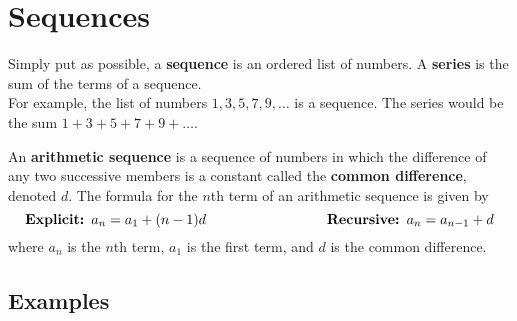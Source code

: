 \documentclass[addpoints]{exam}
\begin{document}
\section*{Sequences}\label{sec:sequences1}
\begin{tcolorbox}[title=Definition: \textit{Sequence vs Series},title filled,colframe=black,sharpish corners,width=\linewidth]
Simply put as possible, a \textbf{sequence} is an ordered list of numbers. A \textbf{series} is the sum of the terms of a sequence.\\


For example, the list of numbers $1, 3, 5, 7, 9, \ldots$ is a sequence. The series would be the sum $1+3+5+7+9+\ldots$.

\end{tcolorbox}

\begin{tcolorbox}[title=Definition: \textit{Arithmetic Sequence},title filled,colframe=black,sharpish corners,width=\linewidth]

An \textbf{arithmetic sequence} is a sequence of numbers in which the difference of any two successive members is a constant called the \textbf{common difference}, denoted $d$. The formula for the $n$th term of an arithmetic sequence is given by
\[\textbf{Explicit:  }a_n = a_1 + (n-1)d\hspace{1.2in}\textbf{Recursive: }a_n=a_{n-1}+d\]
where $a_n$ is the $n$th term, $a_1$ is the first term, and $d$ is the common difference.

\end{tcolorbox}

\subsection*{Examples}\label{subsec:examples2}
\end{document}
